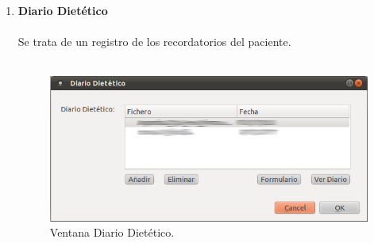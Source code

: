 \begin{enumerate}
\item \textbf{Diario Dietético}\\\\
Se trata de un registro de los recordatorios del paciente.\\\\
\begin{figure}[H]
  \label{diariodiet}
  \begin{center}
    \includegraphics[scale=0.5]{../../Image/diariodiet.png}
  \end{center}
  \caption{Ventana Diario Dietético.}
\end{figure}


\end{enumerate}
